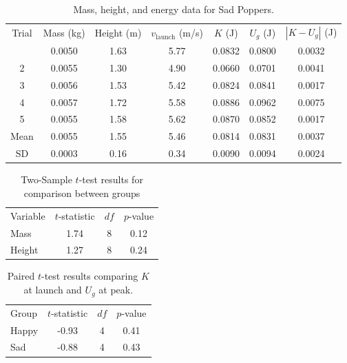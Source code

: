 \documentclass[amsmath,amssymb,aps,endfloats,linenumbers]{revtex4-2}
\begin{document}
\begin{table}[ht]
\caption{Mass, height, and energy data for Sad Poppers.}
\label{tab:sad}
\begin{ruledtabular}
\begin{tabular}{ccccccc}
Trial & Mass (kg) & Height (m) & $v_{\text{launch}}$ (m/s) & $K$ (J) & $U_g$ (J) & $|K-U_g|$ (J) \\
\colrule
1 & 0.0050 & 1.63 & 5.77 & 0.0832 & 0.0800 & 0.0032 \\
2 & 0.0055 & 1.30 & 4.90 & 0.0660 & 0.0701 & 0.0041 \\
3 & 0.0056 & 1.53 & 5.42 & 0.0824 & 0.0841 & 0.0017 \\
4 & 0.0057 & 1.72 & 5.58 & 0.0886 & 0.0962 & 0.0075 \\
5 & 0.0055 & 1.58 & 5.62 & 0.0870 & 0.0852 & 0.0017 \\
\colrule
Mean & 0.0055 & 1.55 & 5.46 & 0.0814 & 0.0831 & 0.0037 \\
SD & 0.0003 & 0.16 & 0.34 & 0.0090 & 0.0094 & 0.0024 \\
\end{tabular}
\end{ruledtabular}
\end{table}

\begin{table}[ht]
\caption{Two-Sample $t$-test results for comparison between groups}
\label{tab:ttest_two}
\begin{ruledtabular}
\begin{tabular}{lccc}
Variable & $t$-statistic & $df$ & $p$-value \\
\colrule
Mass & 1.74 & 8 & 0.12 \\
Height & 1.27 & 8 & 0.24 \\
\end{tabular}
\end{ruledtabular}
\end{table}

\begin{table}[ht]
\caption{Paired $t$-test results comparing $K$ at launch and $U_g$ at peak.}
\label{tab:ttest_paired}
\begin{ruledtabular}
\begin{tabular}{lccc}
Group & $t$-statistic & $df$ & $p$-value \\
\colrule
Happy & -0.93 & 4 & 0.41 \\
Sad & -0.88 & 4 & 0.43 \\
\end{tabular}
\end{ruledtabular}
\end{table}
\end{document}
